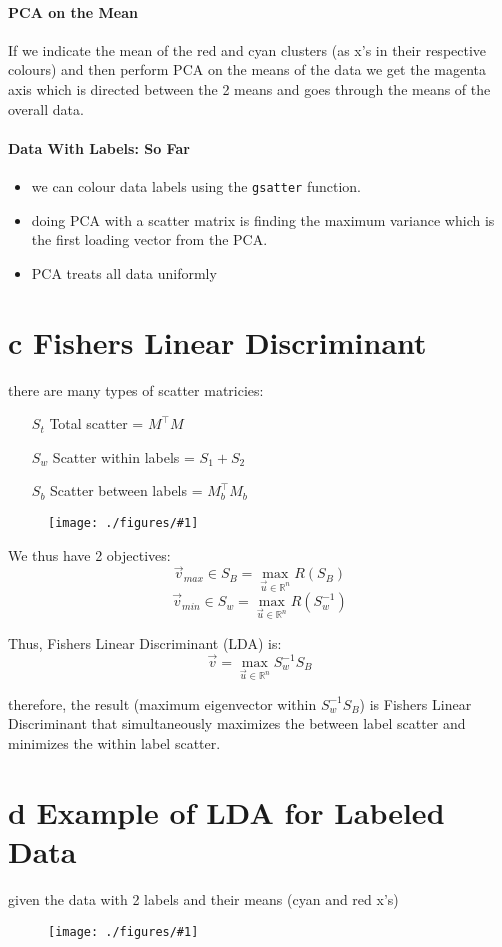 \documentclass[12pt]{book}
\newcommand{\incimg}[2]{%
       \begin{figure}[h]
               \centering
               \texttt{[image: ./figures/\#1]}
       \end{figure}
}
\begin{document}
\paragraph{PCA on the Mean}
If we indicate the mean of the red and cyan clusters (as x's in their respective colours)
and then perform PCA on the means of the data we get the magenta axis which is directed 
between the 2 means and goes through the means of the overall data.

\paragraph{Data With Labels: So Far}
\begin{itemize}
        \item we can colour data labels using the \texttt{gsatter} function.
        \item doing PCA with a scatter matrix is finding the maximum variance which is the 
                first loading vector from the PCA.
        \item PCA treats all data uniformly
\end{itemize}
\pagebreak

\section*{c Fishers Linear Discriminant}
there are many types of scatter matricies:
\begin{itemize}
        \item[$S_t$] Total scatter = $M^\top M$
        \item[$S_w$] Scatter within labels = $S_1 + S_2$
        \item[$S_b$] Scatter between labels = $M_b^\top M_b$
\end{itemize}
\incimg{scatterMat}{0.7}

We thus have 2 objectives:
\[\vec v_{max} \in S_B = \max_{\vec u \in \mathbb{R}^n}R(S_B)\]
\[\vec v_{min} \in S_w = \max_{\vec u \in \mathbb{R}^n}R(S^{-1}_w)\]

Thus, Fishers Linear Discriminant (LDA) is:
\[\vec v = \max_{\vec u \in \mathbb{R}^n} S_w^{-1}S_B\]

therefore, the result (maximum eigenvector within $S_w^{-1} S_B$) is Fishers Linear
Discriminant that simultaneously maximizes the between label scatter and minimizes the
within label scatter.
\pagebreak

\section*{d Example of LDA for Labeled Data}
given the data with 2 labels and their means (cyan and red x's) 
\incimg{data2}{0.5}
\end{document}

